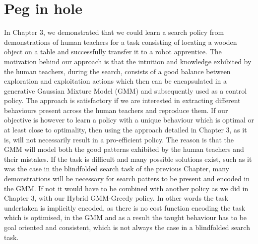 \chapter{Peg in hole}

In Chapter 3, we demonstrated that we could learn a search policy from demonstrations of human teachers for a task consisting of locating a wooden 
object on a table and successfully transfer it to a robot apprentice. The motivation behind our approach is that the intuition 
and knowledge exhibited by the human teachers, during the search, consists of a good balance between exploration and 
exploitation actions which then can be encapsulated in a generative Gaussian Mixture Model (GMM) and subsequently used as a control policy. The approach
is satisfactory if we are interested in extracting different behaviours present across the human teachers and reproduce 
them. If our objective is however to learn a policy with a unique behaviour which is optimal or at least close to optimality, then using  
the approach detailed in Chapter 3, as it is, will not necessarily result in a pro-efficient policy. The reason is that the GMM will model
both the good patterns exhibited by the human teachers and their mistakes. If the task is difficult and many possible solutions exist, such 
as it was the case in the blindfolded search task of the previous Chapter, many demonstrations will be necessary for search patters to be 
present and encoded in the GMM. If not it would have to be combined with another policy as we did in Chapter 3, with our Hybrid GMM-Greedy 
policy. In other words the task undertaken is implicitly encoded, as there is no cost function encoding the task which is optimised, in 
the GMM and as a result the taught behaviour has to be goal oriented and consistent, which is not always the case in a blindfolded search task. 

